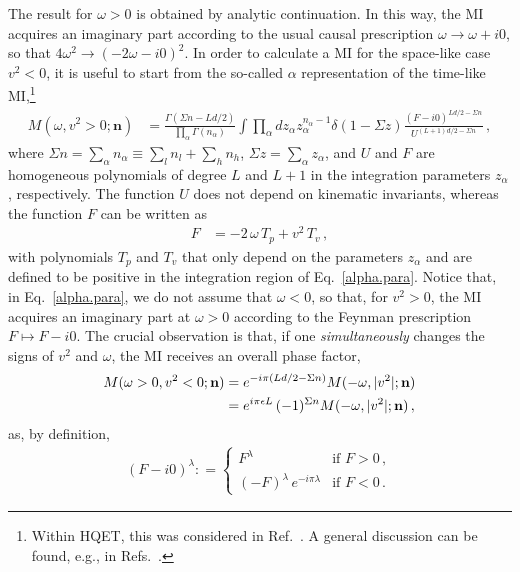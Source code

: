 \documentclass[12pt]{article}
\numberwithin{equation}{section}
\newcommand{\1}[1]{\mathbf{1}^{#1}}
\newcommand{\2}[1]{\mathbf{2}^{#1}}
\newcommand{\3}[1]{\mathbf{3}^{#1}}
\newcommand{\4}[1]{\mathbf{4}^{#1}}
\newcommand{\5}[1]{\mathbf{5}^{#1}}
\newcommand{\defas}{\mathrel{\mathop:}=}
\newcommand{\mlabel}[1]{ \text{\footnotesize \hspace{3mm}\fbox{\fbox{$#1$}} \label{#1}}}
\renewcommand{\mlabel}[1]{\label{#1}}
\newcommand{\vv}{v^2}
\begin{document}
The result for $\omega>0$ is obtained by analytic continuation. In this way,
the MI acquires an imaginary part according to the usual causal prescription 
$\omega \to \omega +i0$, so that $4\omega^2 \to (-2\omega- i0)^2$. 
In order to calculate a MI for the space-like case $\vv<0$, 
it is useful to start from the so-called $\alpha$ representation of the time-like MI,\footnote{%
Within HQET,
this was considered in Ref.~\cite{Grozin:2003eg}. A general discussion can be found, e.g., in Refs.~\cite{Smirnov:2012gma,Lee:2013mka}.} 
\begin{align}
  M(\omega, \vv >0; \mathbf{n})&=
  \frac{\Gamma\left(\Sigma n -Ld/2\right)}{\prod_{\alpha}\Gamma\left(n_{\alpha}\right)}
  \int\prod_{\alpha}dz_{\alpha}z_{\alpha}^{n_{\alpha}-1}\delta\left(1-\Sigma z\right)
  \frac{(F-i0)^{Ld/2-\Sigma n}}{U^{\left(L+1\right)d/2-\Sigma n}}  \,,
\mlabel{alpha.para}
\end{align} 
where $\Sigma n=\sum_{\alpha}n_{\alpha}\equiv \sum_l n_l + \sum_h n_h $, $\Sigma z=\sum_{\alpha}z_{\alpha}$, and
$U$ and $F$ are homogeneous polynomials of degree $L$ and $L+1$ in the integration parameters
$z_{\alpha}$, respectively. The function $U$ does not depend on kinematic invariants, whereas the 
function $F$ can be written as
\begin{align}
F&=  -2\,\omega\,  T_p + \vv \,T_v
\mlabel{F}
\,,  
\end{align}
with polynomials $T_p$ and $T_v$ that only depend on the parameters
$z_{\alpha}$ 
and are defined to be positive in the integration region of Eq.~\eqref{alpha.para}.
Notice that, in Eq.~\eqref{alpha.para}, we do not assume that $\omega <0$, so that, for $\vv >0$, the MI acquires an
imaginary part at $\omega>0$ according to the Feynman prescription $F\mapsto F-i0$.
The crucial observation is that, if one \emph{simultaneously} changes the signs of $\vv$ and $\omega$, the MI receives an overall phase factor,
\begin{align}
    M(\omega > 0 , \vv < 0; \mathbf{n})& = e^{-i\pi(Ld/2-\Sigma n)} 
    M(- \omega, |\vv| ; \mathbf{n})
\notag\\&=
   e^{i\pi \epsilon L}\, (-1)^{\Sigma n} M(- \omega, |\vv| ; \mathbf{n})\,,
\end{align} 
as, by definition,
\begin{align}
(F - i0)^{\lambda} \defas  
 \begin{cases}
  F^{\lambda}      & \text{if $F>0$}\,,
  \\
  (-F)^{\lambda} \,   e^{- i\pi \lambda} &  \text{if $F<0$}\,.
  \end{cases}
\mlabel{x-i0}
 \end{align}
\end{document}
